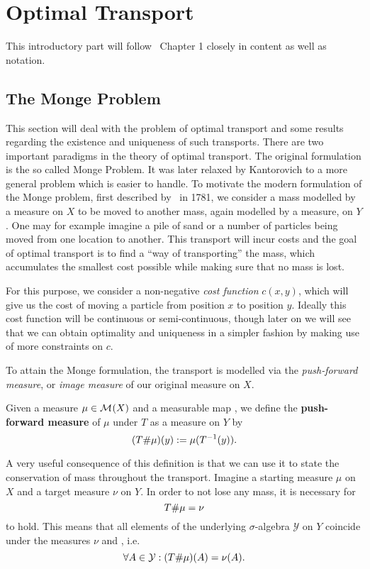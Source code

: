 \chapter{Optimal Transport}\label{OT}

This introductory part will follow~\cite{San2015} Chapter 1 closely in content as well as notation.

\section{The Monge Problem}\label{TheMonProb}
This section will deal with the problem of optimal transport and some results regarding the existence and uniqueness of such transports. There are two important paradigms in the theory of optimal transport. The original formulation is the so called Monge Problem. It was later relaxed by Kantorovich to a more general problem which is easier to handle. To motivate the modern formulation of the Monge problem, first described by\ \cite{Mon1781} in 1781, we consider a mass modelled by a measure on $X$ to be moved to another mass, again modelled by a measure, on $Y$. One may for example imagine a pile of sand or a number of particles being moved from one location to another. This transport will incur costs and the goal of optimal transport is to find a ``way of transporting'' the mass, which accumulates the smallest cost possible while making sure that no mass is lost.

For this purpose, we consider a non-negative \textit{cost function} $c(x, y)$, which will give us the cost of moving a particle from position $x$ to position $y$. Ideally this cost function will be continuous or semi-continuous, though later on we will see that we can obtain optimality and uniqueness in a simpler fashion by making use of more constraints on $c$.

To attain the Monge formulation, the transport is modelled via the \textit{push-forward measure}, or \textit{image measure} of our original measure on $X$.

\begin{definition}\label{PushForward}
	Given a measure $\mu \in \mathcal{M}_{}(X)$ and a measurable map , we define the \textbf{push-forward measure} of $\mu$ under $T$ as a measure on $Y$ by
	\[ ({T} \# \mu)(y) := \mu(T^{-1} (y)). \]
\end{definition}

A very useful consequence of this definition is that we can use it to state the conservation of mass throughout the transport. Imagine a starting measure $\mu$ on $X$ and a target measure $\nu$ on $Y$. In order to not lose any mass, it is necessary for
\[ {T} \# \mu = \nu \]
to hold. This means that all elements of the underlying $\sigma$-algebra $\mathcal{Y}$ on $Y$ coincide under the measures $\nu$ and \push{\mu}, i.e.
\[ \forall A \in \mathcal{Y}: ({T} \# \mu)(A) = \nu(A).\]

